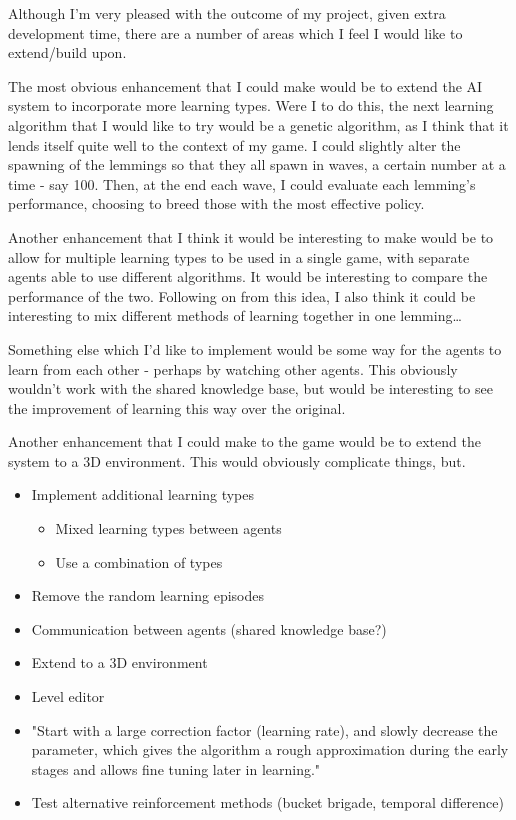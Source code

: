 \documentclass[a4paper,oneside]{report}
\begin{document}
Although I'm very pleased with the outcome of my project, given extra development time, there are a number of areas which I feel I would like to extend/build upon.

The most obvious enhancement that I could make would be to extend the AI system to incorporate more learning types. Were I to do this, the next learning algorithm that I would like to try would be a genetic algorithm, as I think that it lends itself quite well to the context of my game. I could slightly alter the spawning of the lemmings so that they all spawn in waves, a certain number at a time - say 100. Then, at the end each wave, I could evaluate each lemming's performance, choosing to breed those with the most effective policy.

Another enhancement that I think it would be interesting to make would be to allow for multiple learning types to be used in a single game, with separate agents able to use different algorithms. It would be interesting to compare the performance of the two. Following on from this idea, I also think it could be interesting to mix different methods of learning together in one lemming…

Something else which I'd like to implement would be some way for the agents to learn from each other - perhaps by watching other agents. This obviously wouldn't work with the shared knowledge base, but would be interesting to see the improvement of learning this way over the original.

Another enhancement that I could make to the game would be to extend the system to a 3D environment. This would obviously complicate things, but.

\begin{itemize}
	\item Implement additional learning types
	\begin{itemize}
		\item Mixed learning types between agents
    	\item Use a combination of types
    \end{itemize}
    \item Remove the random learning episodes
    \item Communication between agents (shared knowledge base?)
    \item Extend to a 3D environment
    \item Level editor
    \item "Start with a large correction factor (learning rate), and slowly decrease the parameter, which gives the algorithm a rough approximation during the early stages and allows fine tuning later in learning."
    \item Test alternative reinforcement methods (bucket brigade, temporal difference) 
\end{itemize}
\end{document}
